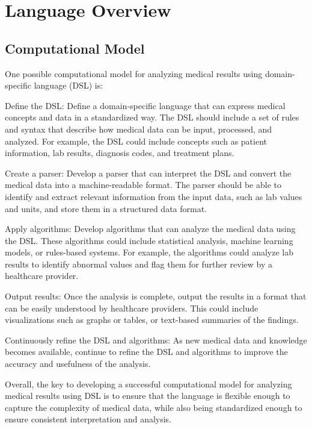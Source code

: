\chapter{Language Overview}


\section{Computational Model}
One possible computational model for analyzing medical results using domain-specific language (DSL) is:

Define the DSL: Define a domain-specific language that can express medical concepts and data in a standardized way. The DSL should include a set of rules and syntax that describe how medical data can be input, processed, and analyzed. For example, the DSL could include concepts such as patient information, lab results, diagnosis codes, and treatment plans.
\begin{itemize}
\hitem Create a parser: Develop a parser that can interpret the DSL and convert the medical data into a machine-readable format. The parser should be able to identify and extract relevant information from the input data, such as lab values and units, and store them in a structured data format.

\hitem Apply algorithms: Develop algorithms that can analyze the medical data using the DSL. These algorithms could include statistical analysis, machine learning models, or rules-based systems. For example, the algorithms could analyze lab results to identify abnormal values and flag them for further review by a healthcare provider.

\hitem Output results: Once the analysis is complete, output the results in a format that can be easily understood by healthcare providers. This could include visualizations such as graphs or tables, or text-based summaries of the findings.

\hitem Continuously refine the DSL and algorithms: As new medical data and knowledge becomes available, continue to refine the DSL and algorithms to improve the accuracy and usefulness of the analysis.
\end{itemize}

Overall, the key to developing a successful computational model for analyzing medical results using DSL is to ensure that the language is flexible enough to capture the complexity of medical data, while also being standardized enough to ensure consistent interpretation and analysis.


